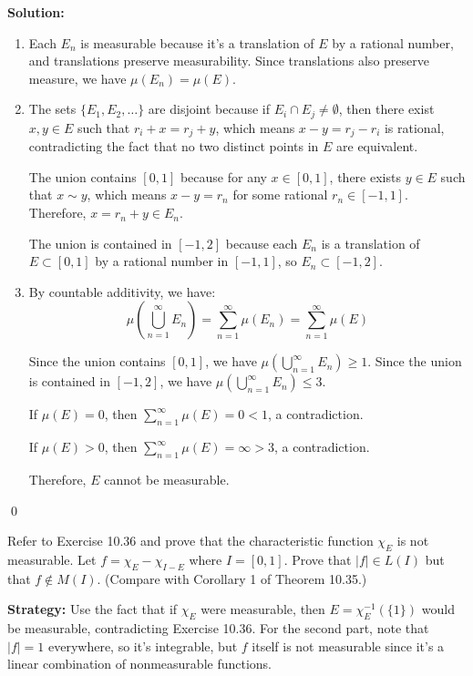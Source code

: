 \bigskip\noindent\textbf{Solution:}
\begin{enumerate}[label=(\alph*)]
\item Each $E_n$ is measurable because it's a translation of $E$ by a rational number, and translations preserve measurability. Since translations also preserve measure, we have $\mu(E_n) = \mu(E)$.

\item The sets $\{E_1, E_2, \ldots \}$ are disjoint because if $E_i \cap E_j \neq \emptyset$, then there exist $x, y \in E$ such that $r_i + x = r_j + y$, which means $x - y = r_j - r_i$ is rational, contradicting the fact that no two distinct points in $E$ are equivalent.

The union contains $[0, 1]$ because for any $x \in [0, 1]$, there exists $y \in E$ such that $x \sim y$, which means $x - y = r_n$ for some rational $r_n \in [-1, 1]$. Therefore, $x = r_n + y \in E_n$.

The union is contained in $[-1, 2]$ because each $E_n$ is a translation of $E \subset [0, 1]$ by a rational number in $[-1, 1]$, so $E_n \subset [-1, 2]$.

\item By countable additivity, we have:
\[\mu\left(\bigcup_{n=1}^{\infty} E_n\right) = \sum_{n=1}^{\infty} \mu(E_n) = \sum_{n=1}^{\infty} \mu(E)\]

Since the union contains $[0, 1]$, we have $\mu(\bigcup_{n=1}^{\infty} E_n) \geq 1$. Since the union is contained in $[-1, 2]$, we have $\mu(\bigcup_{n=1}^{\infty} E_n) \leq 3$.

If $\mu(E) = 0$, then $\sum_{n=1}^{\infty} \mu(E) = 0 < 1$, a contradiction.

If $\mu(E) > 0$, then $\sum_{n=1}^{\infty} \mu(E) = \infty > 3$, a contradiction.

Therefore, $E$ cannot be measurable.
\end{enumerate}\qed


\begin{problembox}
\begin{problemstatement}
Refer to Exercise 10.36 and prove that the characteristic function $\chi_E$ is not measurable. Let $f = \chi_E - \chi_{I-E}$ where $I = [0, 1]$. Prove that $|f| \in L(I)$ but that $f \notin M(I)$. (Compare with Corollary 1 of Theorem 10.35.)
\end{problemstatement}
\end{problembox}

\noindent\textbf{Strategy:} Use the fact that if $\chi_E$ were measurable, then $E = \chi_E^{-1}(\{1\})$ would be measurable, contradicting Exercise 10.36. For the second part, note that $|f| = 1$ everywhere, so it's integrable, but $f$ itself is not measurable since it's a linear combination of nonmeasurable functions.

